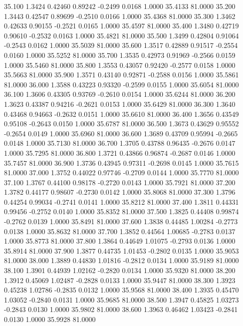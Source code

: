   35.100   1.3424   0.42460   0.89242  -0.2499   0.0168   1.0000  35.4133  81.0000
  35.200   1.3443   0.42547   0.89699  -0.2510   0.0166   1.0000  35.4368  81.0000
  35.300   1.3462   0.42633   0.90155  -0.2521   0.0165   1.0000  35.4597  81.0000
  35.400   1.3480   0.42719   0.90610  -0.2532   0.0163   1.0000  35.4821  81.0000
  35.500   1.3499   0.42804   0.91064  -0.2543   0.0162   1.0000  35.5039  81.0000
  35.600   1.3517   0.42889   0.91517  -0.2554   0.0160   1.0000  35.5252  81.0000
  35.700   1.3535   0.42973   0.91969  -0.2566   0.0159   1.0000  35.5460  81.0000
  35.800   1.3553   0.43057   0.92420  -0.2577   0.0158   1.0000  35.5663  81.0000
  35.900   1.3571   0.43140   0.92871  -0.2588   0.0156   1.0000  35.5861  81.0000
  36.000   1.3588   0.43223   0.93320  -0.2599   0.0155   1.0000  35.6054  81.0000
  36.100   1.3606   0.43305   0.93769  -0.2610   0.0154   1.0000  35.6244  81.0000
  36.200   1.3623   0.43387   0.94216  -0.2621   0.0153   1.0000  35.6429  81.0000
  36.300   1.3640   0.43468   0.94663  -0.2632   0.0151   1.0000  35.6610  81.0000
  36.400   1.3656   0.43549   0.95108  -0.2643   0.0150   1.0000  35.6787  81.0000
  36.500   1.3673   0.43629   0.95552  -0.2654   0.0149   1.0000  35.6960  81.0000
  36.600   1.3689   0.43709   0.95994  -0.2665   0.0148   1.0000  35.7130  81.0000
  36.700   1.3705   0.43788   0.96435  -0.2676   0.0147   1.0000  35.7295  81.0000
  36.800   1.3721   0.43866   0.96874  -0.2687   0.0146   1.0000  35.7457  81.0000
  36.900   1.3736   0.43945   0.97311  -0.2698   0.0145   1.0000  35.7615  81.0000
  37.000   1.3752   0.44022   0.97746  -0.2709   0.0144   1.0000  35.7770  81.0000
  37.100   1.3767   0.44100   0.98178  -0.2720   0.0143   1.0000  35.7921  81.0000
  37.200   1.3782   0.44177   0.98607  -0.2730   0.0142   1.0000  35.8068  81.0000
  37.300   1.3796   0.44254   0.99034  -0.2741   0.0141   1.0000  35.8212  81.0000
  37.400   1.3811   0.44331   0.99456  -0.2752   0.0140   1.0000  35.8352  81.0000
  37.500   1.3825   0.44408   0.99874  -0.2762   0.0139   1.0000  35.8491  81.0000
  37.600   1.3838   0.44485   1.00284  -0.2773   0.0138   1.0000  35.8632  81.0000
  37.700   1.3852   0.44564   1.00685  -0.2783   0.0137   1.0000  35.8773  81.0000
  37.800   1.3864   0.44649   1.01075  -0.2793   0.0136   1.0000  35.8914  81.0000
  37.900   1.3877   0.44735   1.01453  -0.2802   0.0135   1.0000  35.9053  81.0000
  38.000   1.3889   0.44830   1.01816  -0.2812   0.0134   1.0000  35.9189  81.0000
  38.100   1.3901   0.44939   1.02162  -0.2820   0.0134   1.0000  35.9320  81.0000
  38.200   1.3912   0.45069   1.02487  -0.2828   0.0133   1.0000  35.9447  81.0000
  38.300   1.3923   0.45238   1.02786  -0.2835   0.0132   1.0000  35.9568  81.0000
  38.400   1.3935   0.45470   1.03052  -0.2840   0.0131   1.0000  35.9685  81.0000
  38.500   1.3947   0.45825   1.03273  -0.2843   0.0130   1.0000  35.9802  81.0000
  38.600   1.3963   0.46462   1.03423  -0.2841   0.0130   1.0000  35.9928  81.0000
